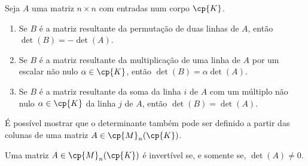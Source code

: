 \begin{proposicao}
	Seja $A$ uma matriz $n \times n$ com entradas num corpo $\cp{K}$.
	\begin{enumerate}[label={\roman*})]
		\item Se $B$ é a matriz resultante da permutação de duas linhas de $A$, então $\det (B) = -\det (A)$.
		\item Se $B$ é a matriz resultante da multiplicação de uma linha de $A$ por um escalar não nulo $\alpha \in \cp{K}$, então $\det(B) = \alpha\det(A)$.
		\item Se $B$ é a matriz resultante da soma da linha $i$ de $A$ com um múltiplo não nulo $\alpha \in \cp{K}$ da linha $j$ de $A$, então $\det(B) = \det(A)$.
	\end{enumerate}
\end{proposicao}

\begin{observacao}
	É possível mostrar que o determinante também pode ser definido a partir das colunas de uma matriz $A \in \cp{M}_n(\cp{K})$.
\end{observacao}

\begin{teorema}
	Uma matriz $A \in \cp{M}_n(\cp{K})$ é invertível se, e somente se, $\det(A) \ne 0$.
\end{teorema}

